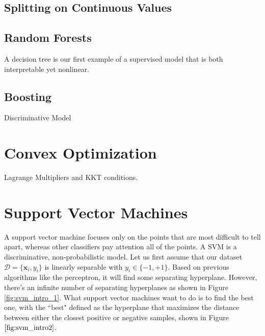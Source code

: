 \documentclass{article}
\theoremstyle{definition}
\begin{document}
  \subsection{Splitting on Continuous Values}



  \subsection{Random Forests}
  A decision tree is our first example of a supervised model that is both interpretable yet nonlinear. 


  \subsection{Boosting}



  Discriminative Model

\section{Convex Optimization}

  Lagrange Multipliers and KKT conditions. 

\section{Support Vector Machines}

  A support vector machine focuses only on the points that are most difficult to tell apart, whereas other classifiers pay attention all of the points. A SVM is a discriminative, non-probabilistic model. Let us first assume that our dataset $\mathcal{D} = \{\mathbf{x}_i, y_i\}$ is linearly separable with $y_i \in \{-1, +1\}$. Based on previous algorithms like the perceptron, it will find some separating hyperplane. However, there's an infinite number of separating hyperplanes as shown in Figure \ref{fig:svm_intro_1}. What support vector machines want to do is to find the best one, with the ``best" defined as the hyperplane that maximizes the distance between either the closest positive or negative samples, shown in Figure $\ref{fig:svm_intro2}$.  
\end{document}
